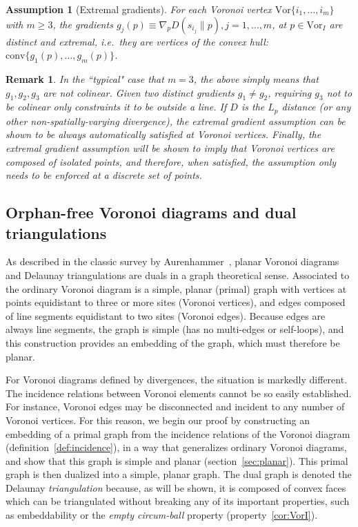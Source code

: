 \documentclass[11pt]{article}
\newtheorem{assumption}{Assumption}
\newtheorem{remark}{Remark}
\newcommand{\Vor}{\text{Vor}}
\newcommand{\D}[2]{D\left(#1 \parallel #2\right)}
\newcommand{\CH}[1]{\text{conv} #1 }
\begin{document}
\begin{assumption}[Extremal gradients]\label{ass:EGA}
	For each Voronoi vertex $\Vor\{i_1,\dots,i_m\}$ with $m\ge 3$, 
		the gradients $g_j(p)\equiv\nabla_p \D{s_{i_j}}{p}, j=1,\dots,m$, at $p\in\Vor_I$ are distinct and extremal, 
		i.e.\ they are vertices of the convex hull:  $\CH\{g_1(p),\dots,g_m(p)\}$. 
\end{assumption}

\begin{remark}
	In the ``typical" case that $m=3$, the above simply means that $g_1,g_2,g_3$ are not colinear. 
	Given two distinct gradients $g_1\ne g_2$, requiring $g_3$ not to be colinear only constraints it 
		to be outside a line.  
	If $D$ is the $L_p$ distance  (or any other non-spatially-varying divergence), 
	the extremal gradient assumption can be shown to be always automatically satisfied at Voronoi vertices. 
	Finally, the extremal gradient assumption will be shown to imply that Voronoi vertices are composed of isolated points, 
		and therefore, when satisfied, the assumption only needs to be enforced at a discrete set of points. 
\end{remark}



	

\subsection{Orphan-free Voronoi diagrams and dual triangulations}\label{sec:simpleplanar}



As described in the classic survey by Aurenhammer~\cite{Aurenhammer:1991}, 
	planar Voronoi diagrams and Delaunay triangulations are duals in a graph theoretical sense. 
Associated to the ordinary Voronoi diagram is a simple, planar (primal) graph with vertices at 
	points equidistant to three or more sites (Voronoi vertices), 
	and edges composed of line segments 
	equidistant to two sites (Voronoi edges). 
Because edges are always line segments, the graph is simple (has no multi-edges or self-loops), 
	and this construction provides an embedding of the graph, which must therefore be planar. 

	
	
For Voronoi diagrams defined by divergences, the situation is markedly different. 
The incidence relations between Voronoi elements cannot be so easily established. 
For instance, Voronoi edges may be disconnected and incident to any number of Voronoi vertices. 
For this reason, we begin our proof by constructing an embedding of a primal graph 
	from the incidence relations of the Voronoi diagram (definition~\ref{def:incidence}), 
	in a way that generalizes ordinary Voronoi diagrams, 
	and show that this graph is simple and planar (section~\ref{sec:planar}).
This primal graph is then dualized into a simple, planar graph. 
The dual graph is denoted the Delaunay \emph{triangulation} because, as will be shown, 
	it is composed of convex faces which can be triangulated without breaking any of 
	its important properties, such as embeddability or the \emph{empty circum-ball} property (property~\ref{cor:VorI}). 	
\end{document}
